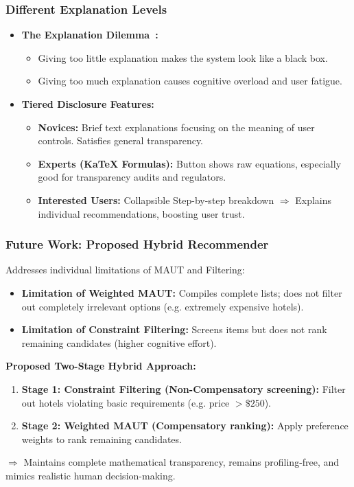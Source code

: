 \begin{frame}
    \frametitle{Different Explanation Levels}
    \begin{itemize}
        \item \textbf{The Explanation Dilemma~\cite{tintarev2012evaluating}:}
            \begin{itemize}
                \item Giving too little explanation makes the system look like a black box.
                \item Giving too much explanation causes cognitive overload and user fatigue.
            \end{itemize}
        \item \textbf{Tiered Disclosure Features:}
            \begin{itemize}
                \item \textbf{Novices:} Brief text explanations focusing on the meaning of user controls. Satisfies general transparency.
                \item \textbf{Experts (KaTeX Formulas):} Button shows raw equations, especially good for transparency audits and regulators.
                \item \textbf{Interested Users:} Collapsible Step-by-step breakdown $\Rightarrow$ Explains individual recommendations, boosting user trust.
            \end{itemize}
    \end{itemize}
\end{frame}
\begin{frame}
    \frametitle{Future Work: Proposed Hybrid Recommender}
    Addresses individual limitations of MAUT and Filtering:
    \begin{itemize}
        \item \textbf{Limitation of Weighted MAUT:} Compiles complete lists; does not filter out completely irrelevant options (e.g. extremely expensive hotels).
        \item \textbf{Limitation of Constraint Filtering:} Screens items but does not rank remaining candidates (higher cognitive effort).
    \end{itemize}
    \textbf{Proposed Two-Stage Hybrid Approach:}
    \begin{enumerate}
        \item \textbf{Stage 1: Constraint Filtering (Non-Compensatory screening):} Filter out hotels violating basic requirements (e.g. price $> \$250$).
        \item \textbf{Stage 2: Weighted MAUT (Compensatory ranking):} Apply preference weights to rank remaining candidates.
    \end{enumerate}
    $\Rightarrow$ Maintains complete mathematical transparency, remains profiling-free, and mimics realistic human decision-making.
\end{frame}

